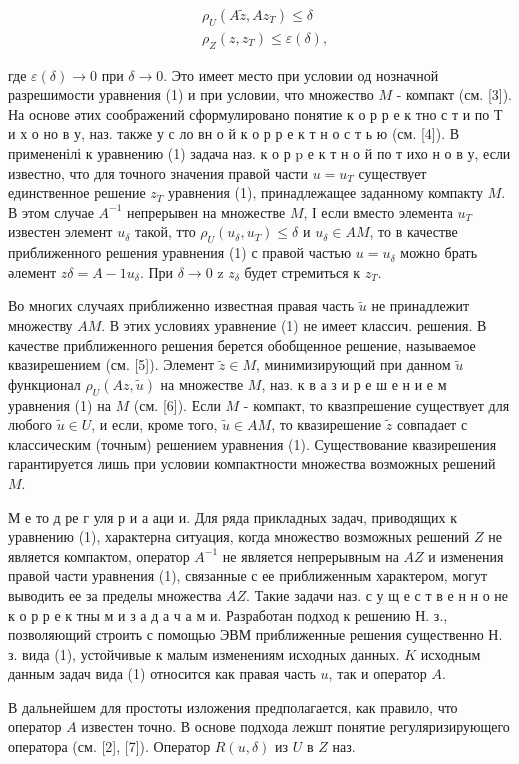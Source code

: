 \documentclass[10pt]{article}
\begin{document}
\[

\begin{aligned}

& \rho_{U}\left(A \tilde{z}, A z_{T}\right) \leqslant \delta \\

& \rho_{Z}\left(z, z_{T}\right) \leqslant \varepsilon(\delta),

\end{aligned}

\]



где $\varepsilon(\delta) \rightarrow 0$ при $\delta \rightarrow 0$. Это имеет место при условии од нозначной разрешимости уравнения (1) и при условии, что множество $M$ - компакт (см. [3]). На основе әтих соображений сформулировано понятие к о р р е к тно с т и по Т и х о но в у, наз. также у с ло вн о й к о р р е к т н о с т ь ю (см. [4]). В примененілі к уравнению (1) задача наз. к о р $\mathrm{p}$ е к т н о й по т ихо н о в у, если известно, что для точного значения правой части $u=u_{T}$ существует единственное решение $z_{T}$ уравнения (1), принадлежащее заданному компакту $M$. В этом случае $A^{-1}$ непрерывен на множестве $M$, І если вместо элемента $u_{T}$ известен элемент $u_{\delta}$ такой, тто $\rho_{U}\left(u_{\delta}, u_{T}\right) \leqslant \delta$ и $u_{\delta} \in A M$, то в качестве приближенного решения уравнения (1) с правой частью $u=u_{\delta}$ можно брать әлемент $z \delta=A-1 u_{\delta}$. При $\delta \rightarrow 0$ z $z_{\delta}$ будет стремиться к $z_{T}$.



Во многих случаях приближенно известная правая часть $\tilde{u}$ не принадлежит множеству $A M$. В этих условиях уравнение (1) не имеет классич. решения. В качестве приближенного решения берется обобщенное решение, называемое квазирешением (см. [5]). Элемент $\tilde{z} \in M$, минимизирующий при данном $\tilde{u}$ функционал $\rho_{U}(A z, \tilde{u})$ на множестве $M$, наз. к в а з и р е ш е н и е м уравнения (1) на $M$ (см. [6]). Если $M$ - компакт, то квазпрешение существует для любого $\tilde{u} \in U$, и если, кроме того, $\tilde{u} \in A M$, то квазирешение $\tilde{z}$ совпадает с классическим (точным) решением уравнения (1). Существование квазирешения гарантируется лишь при условии компактности множества возможных решений $M$.



М е то д ре г уля р и а аци и. Для ряда прикладных задач, приводящих к уравнению (1), характерна ситуация, когда множество возможных решений $Z$ не является компактом, оператор $A^{-1}$ не является непрерывным на $A Z$ и изменения правой части уравнения (1), связанные с ее приближенным характером, могут выводить ее за пределы множества $A Z$. Такие задачи наз. с у щ е с т в е н н о не к о р р е к тны м и з а д а ч а м и. Разработан подход к решению Н. з., позволяющий строить с помощью ЭВМ приближенные решения существенно Н. з. вида (1), устойчивые к малым изменениям исходных данных. $K$ исходным данным задач вида (1) относится как правая часть $u$, так и оператор $A$.



В дальнейшем для простоты изложения предполагается, как правило, что оператор $A$ известен точно. В основе подхода лежшт понятие регуляризирующего оператора (см. [2], [7]). Оператор $R(u, \delta)$ из $U$ в $Z$ наз.
\end{document}
